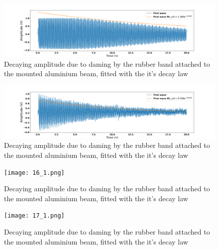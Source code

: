 \begin{figure}[H]
	\centering
	\includegraphics[scale=0.35]{04_1.png}
	\caption{Decaying amplitude due to daming by the rubber band attached to the mounted aluminium beam, fitted with the it's decay law}
	\label{fig:mb-fe-0}
\end{figure}

\begin{figure}[H]
	\centering
	\includegraphics[scale=0.35]{05_1.png}
	\caption{Decaying amplitude due to daming by the rubber band attached to the mounted aluminium beam, fitted with the it's decay law}
	\label{fig:mb-fe-0}
\end{figure}
\begin{figure}[H]
	\centering
	\texttt{[image: 16\_1.png]}
	\caption{Decaying amplitude due to daming by the rubber band attached to the mounted aluminium beam, fitted with the it's decay law}
	\label{fig:mb-fe-0}
\end{figure}
\begin{figure}[H]
	\centering
	\texttt{[image: 17\_1.png]}
	\caption{Decaying amplitude due to daming by the rubber band attached to the mounted aluminium beam, fitted with the it's decay law}
	\label{fig:mb-fe-0}
\end{figure}
\setcounter{equation}{0}
\setcounter{table}{0}
\setcounter{figure}{0}